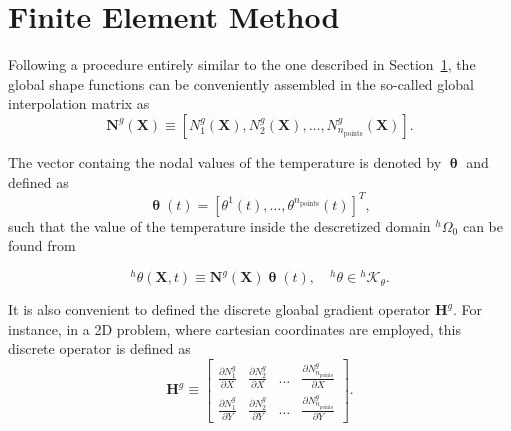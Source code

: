 \section{Finite Element Method}

Following a procedure entirely similar to the one described in Section~\ref{}, the global shape functions can be conveniently assembled in the so-called global interpolation matrix as
\begin{equation}
\mathbf{N}^{g}(\boldsymbol{X}) \equiv\left[N_1^g(\bm X), N_2^g(\bm X), \dots, N^g_{n_\text{points}}(\bm X)\right].
\end{equation}

The vector containg the nodal values of the temperature is denoted by \(\bm \uptheta\) and defined as
\begin{equation}
 \bm \uptheta (t)= \left[\theta^{1}(t), \dots, \theta^{n_{\text {points}}}(t)\right]^{T},
\end{equation}
such that the value of the temperature inside the descretized domain \(^h\Omega_0\) can be found from
\begin{highlight}
\begin{equation}
{ }^{h} \theta(\bm{X},t) \equiv \mathbf{N}^{g}(\bm{X}) \bm{\uptheta}(t), \quad{ }^{h} \theta \in{ }^{h} \mathscr{K}_\theta.
\end{equation}
\end{highlight}

It is also convenient to defined the discrete gloabal gradient operator \(\mathbf H^g\).
For instance, in a 2D problem, where cartesian coordinates are employed, this discrete operator is defined as
\begin{equation}
  \mathbf H^g\equiv \left[
  \begin{array}{cccc}
    \displaystyle{\frac{\partial N^g_1}{\partial X}} & \displaystyle{\frac{\partial N^g_2}{\partial X}} & \dots & \displaystyle{\frac{\partial N^g_{n_\text{points}}}{\partial X}} \\[10pt]
    \displaystyle{\frac{\partial N^g_1}{\partial Y}} & \displaystyle{\frac{\partial N^g_2}{\partial Y}} & \dots & \displaystyle{\frac{\partial N^g_{n_\text{points}}}{\partial Y}}
  \end{array}
  \right].
\end{equation}

